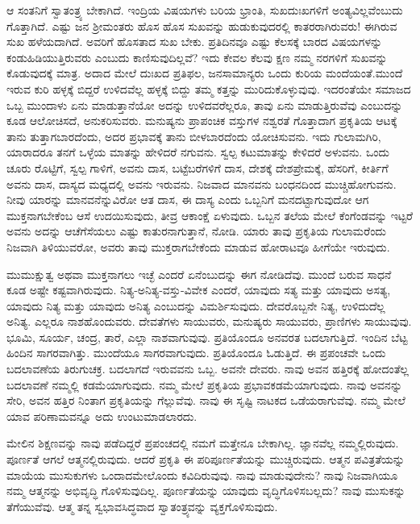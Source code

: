 ಆ ಸಂತನಿಗೆ ಸ್ವಾತಂತ್ರ್ಯ ಬೇಕಾಗಿದೆ. ಇಂದ್ರಿಯ ವಿಷಯಗಳು ಬರಿಯ ಭ್ರಾಂತಿ, ಸುಖದುಃಖಗಳಿಗೆ ಅಂತ್ಯವಿಲ್ಲವೆಂಬುದು ಗೊತ್ತಾಗಿದೆ. ಎಷ್ಟು ಜನ ಶ‍್ರೀಮಂತರು ಹೊಸ ಹೊಸ ಸುಖವನ್ನು ಹುಡುಕುವುದರಲ್ಲಿ ಕಾತರರಾಗಿರುವರು! ಈಗಿರುವ ಸುಖ ಹಳೆಯದಾಗಿದೆ. ಅವರಿಗೆ ಹೊಸತಾದ ಸುಖ ಬೇಕು. ಪ್ರತಿದಿನವೂ ಎಷ್ಟು ಕೆಲಸಕ್ಕೆ ಬಾರದ ವಿಷಯಗಳನ್ನು ಕಂಡುಹಿಡಿಯುತ್ತಿರುವರು ಎಂಬುದು ಕಾಣಿಸುವುದಿಲ್ಲವೆ? ಇದು ಕೇವಲ ಕೆಲವು ಕ್ಷಣ ನಮ್ಮ ನರಗಳಿಗೆ ಸುಖವನ್ನು ಕೊಡುವುದಕ್ಕೆ ಮಾತ್ರ. ಅದಾದ ಮೇಲೆ ದುಃಖದ ಪ್ರತಿಫಲ, ಜನಸಾಮಾನ್ಯರು ಒಂದು ಕುರಿಯ ಮಂದೆಯಂತೆ.\break ಮುಂದೆ ಇರುವ ಕುರಿ ಹಳ್ಳಕ್ಕೆ ಬಿದ್ದರೆ ಉಳಿದವೆಲ್ಲ ಹಳ್ಳಕ್ಕೆ ಬಿದ್ದು ತಮ್ಮ ಕತ್ತನ್ನು ಮುರಿದುಕೊಳ್ಳುವುವು. ಇದರಂತೆಯೇ ಸಮಾಜದ ಒಬ್ಬ ಮುಂದಾಳು ಏನು ಮಾಡುತ್ತಾನೆಯೋ ಅದನ್ನು ಉಳಿದವರೆಲ್ಲರೂ, ತಾವು ಏನು ಮಾಡುತ್ತಿರುವೆವು ಎಂಬುದನ್ನು ಕೂಡ ಆಲೋಚಿಸದೆ, ಅನುಕರಿಸುವರು. ಮನುಷ್ಯನು ಪ್ರಾಪಂಚಿಕ ವಸ್ತುಗಳ ನಶ್ವರತೆ ಗೊತ್ತಾದಾಗ ಪ್ರಕೃತಿಯ ಆಟಕ್ಕೆ ತಾನು ತುತ್ತಾಗಬಾರದೆಂದು, ಅದರ ಪ್ರಭಾವಕ್ಕೆ ತಾನು ಬೀಳಬಾರದೆಂದು ಯೋಚಿಸುವನು. ಇದು ಗುಲಾಮಗಿರಿ, ಯಾರಾದರೂ ತನಗೆ ಒಳ್ಳೆಯ ಮಾತನ್ನು ಹೇಳಿದರೆ ನಗುವನು. ಸ್ವಲ್ಪ ಕಟುಮಾತನ್ನು ಕೇಳಿದರೆ ಅಳುವನು. ಒಂದು ಚೂರು ರೊಟ್ಟಿಗೆ, ಸ್ವಲ್ಪ ಗಾಳಿಗೆ, ಅವನು ದಾಸ, ಬಟ್ಟೆಬರೆಗಳಿಗೆ ದಾಸ, ದೇಶಕ್ಕೆ ದೇಶಪ್ರೇಮಕ್ಕೆ, ಹೆಸರಿಗೆ, ಕೀರ್ತಿಗೆ ಅವನು ದಾಸ, ದಾಸ್ಯದ ಮಧ್ಯದಲ್ಲಿ ಅವನು ಇರುವನು. ನಿಜವಾದ ಮಾನವನು ಬಂಧನದಿಂದ ಮುಚ್ಚಿಹೋಗುವನು. ನೀವು ಯಾರನ್ನು ಮಾನವನೆನ್ನುವಿರೋ ಆತ ದಾಸ, ಈ ದಾಸ್ಯ ಎಂದು ಒಬ್ಬನಿಗೆ ಮನದಟ್ಟಾಗುವುದೋ ಆಗ ಮುಕ್ತನಾಗಬೇಕೆಂಬ ಆಸೆ ಉದಯಿಸುವುದು, ತೀವ್ರ ಆಕಾಂಕ್ಷೆ ಏಳುವುದು. ಒಬ್ಬನ ತಲೆಯ ಮೇಲೆ ಕೆಂಗೆಂಡವನ್ನು ಇಟ್ಟರೆ ಅವನು ಅದನ್ನು ಆಚೆಗೆಸೆಯಲು ಎಷ್ಟು ಕಾತುರನಾಗುತ್ತಾನೆ, ನೋಡಿ. ಯಾರು ತಾವು ಪ್ರಕೃತಿಯ ಗುಲಾಮರೆಂದು ನಿಜವಾಗಿ ತಿಳಿಯುವರೋ, ಅವರು ತಾವು ಮುಕ್ತರಾಗಬೇಕೆಂದು ಮಾಡುವ ಹೋರಾಟವೂ ಹೀಗೆಯೇ ಇರುವುದು.

ಮುಮುಕ್ಷುತ್ವ ಅಥವಾ ಮುಕ್ತನಾಗಲು ಇಚ್ಛೆ ಎಂದರೆ ಏನೆಂಬುದನ್ನು ಈಗ ನೋಡಿದೆವು. ಮುಂದೆ ಬರುವ ಸಾಧನೆ ಕೂಡ ಅಷ್ಟೇ ಕಷ್ಟವಾಗಿರುವುದು. ನಿತ್ಯ-ಅನಿತ್ಯ-\break ವಸ್ತು-ವಿವೇಕ ಎಂದರೆ, ಯಾವುದು ಸತ್ಯ ಮತ್ತು ಯಾವುದು ಅಸತ್ಯ, ಯಾವುದು ನಿತ್ಯ ಮತ್ತು ಯಾವುದು ಅನಿತ್ಯ ಎಂಬುದನ್ನು ವಿಮರ್ಶಿಸುವುದು. ದೇವರೊಬ್ಬನೇ ನಿತ್ಯ, ಉಳಿದುದೆಲ್ಲ ಅನಿತ್ಯ. ಎಲ್ಲರೂ ನಾಶಹೊಂದುವರು. ದೇವತೆಗಳು ಸಾಯುವರು, ಮನುಷ್ಯರು ಸಾಯುವರು, ಪ್ರಾಣಿಗಳು ಸಾಯುವುವು. ಭೂಮಿ, ಸೂರ್ಯ, ಚಂದ್ರ, ತಾರೆ, ಎಲ್ಲಾ ನಾಶವಾಗುವುವು. ಪ್ರತಿಯೊಂದೂ ಅನವರತ ಬದಲಾಗುತ್ತಿದೆ. ಇಂದಿನ ಬೆಟ್ಟ ಹಿಂದಿನ ಸಾಗರವಾಗಿತ್ತು. ಮುಂದೆಯೂ ಸಾಗರವಾಗುವುದು. ಪ್ರತಿಯೊಂದೂ ಓಡುತ್ತಿದೆ. ಈ ಪ್ರಪಂಚವೇ ಒಂದು ಬದಲಾವಣೆಯ ತಿರುಗುಚಕ್ರ. ಬದಲಾಗದೆ ಇರುವವನು ಒಬ್ಬ. ಅವನೇ ದೇವರು. ನಾವು ಅವನ ಹತ್ತಿರಕ್ಕೆ ಹೋದಂತೆಲ್ಲ ಬದಲಾವಣೆ ನಮ್ಮಲ್ಲಿ ಕಡಮೆಯಾಗುವುದು. ನಮ್ಮ ಮೇಲೆ ಪ್ರಕೃತಿಯ ಪ್ರಭಾವ\break ಕಡಮೆಯಾಗುವುದು. ನಾವು ಅವನನ್ನು ಸೇರಿ, ಅವನ ಹತ್ತಿರ ನಿಂತಾಗ ಪ್ರಕೃತಿಯನ್ನು ಗೆಲ್ಲುವೆವು. ನಾವು ಈ ಸೃಷ್ಟಿ ನಾಟಕದ ಒಡೆಯರಾಗುವೆವು. ನಮ್ಮ ಮೇಲೆ ಯಾವ ಪರಿಣಾಮವನ್ನೂ ಅದು ಉಂಟುಮಾಡಲಾರದು.

ಮೇಲಿನ ಶಿಕ್ಷಣವನ್ನು ನಾವು ಪಡೆದಿದ್ದರೆ ಪ್ರಪಂಚದಲ್ಲಿ ನಮಗೆ ಮತ್ತೇನೂ ಬೇಕಾಗಿಲ್ಲ. ಜ್ಞಾನವೆಲ್ಲ ನಮ್ಮಲ್ಲಿರುವುದು. ಪೂರ್ಣತೆ ಆಗಲೆ ಆತ್ಮನಲ್ಲಿರುವುದು. ಆದರೆ ಪ್ರಕೃತಿ ಈ ಪರಿಪೂರ್ಣತೆಯನ್ನು ಮುಚ್ಚಿರುವುದು. ಆತ್ಮನ ಪವಿತ್ರತೆಯನ್ನು ಮಾಯೆಯ ಮುಸುಕುಗಳು ಒಂದಾದಮೇಲೊಂದು ಕವಿದಿರುವುವು. ನಾವು ಮಾಡುವುದೇನು? ನಾವು ನಿಜವಾಗಿಯೂ ನಮ್ಮ ಆತ್ಮನನ್ನು ಅಭಿವೃದ್ಧಿ ಗೊಳಿಸುವುದಿಲ್ಲ. ಪೂರ್ಣತೆಯನ್ನು ಯಾವುದು ವೃದ್ಧಿಗೊಳಿಸಬಲ್ಲದು? ನಾವು ಮುಸುಕನ್ನು ತೆಗೆಯುವೆವು. ಆತ್ಮ ತನ್ನ ಸ್ವಭಾವಸಿದ್ಧವಾದ ಸ್ವಾತಂತ್ರ್ಯವನ್ನು ವ್ಯಕ್ತಗೊಳಿಸುವುದು.

